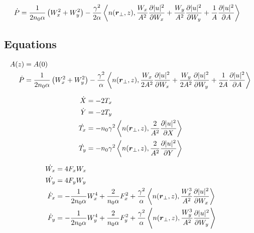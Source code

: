 \begin{equation}
\begin{split}
    \dot{P}  &= \frac{1}{2 n_0 \alpha} \left(W_{x}^2 + W_{y}^2\right)  - \frac{\gamma^2 }{ 2 \alpha }\left<n(\mbox{\boldmath{$r$}}_{\perp},z), \frac{W_{x}}{A^2} \frac{\partial |u|^2}{\partial W_{x}}+ \frac{ W_{y}}{A^2}\frac{\partial |u|^2}{\partial W_{y}}+\frac{1}{A}\frac{\partial |u|^2}{\partial A}\right> 
\end{split}
\end{equation}



\pagebreak
\subsection{Equations}
\begin{equation}
\begin{split}
  A(z) &= A(0)\\
\dot{P}  &= \frac{1}{2 n_0 \alpha} \left(W_{x}^2 + W_{y}^2\right)  - \frac{\gamma^2 }{\alpha } \left<n(\mbox{\boldmath{$r$}}_{\perp},z), \frac{W_{x}}{2A^2} \frac{\partial |u|^2}{\partial W_{x}}+ \frac{ W_{y}}{2A^2}\frac{\partial |u|^2}{\partial W_{y}}+\frac{1}{2A}\frac{\partial |u|^2}{\partial A}\right> \\
\end{split}
\end{equation}

\begin{equation}
\begin{split}
 \dot{X} &= - 2T_x \\
\dot{Y} &= - 2T_y \\
\dot{T_x} &= - n_0 \gamma^2 \left<n(\mbox{\boldmath{$r$}}_{\perp},z), \frac{2}{A^2}\frac{\partial |u|^2}{\partial X}\right> \\
\dot{T_y} &= - n_0 \gamma^2 \left<n(\mbox{\boldmath{$r$}}_{\perp},z), \frac{2}{A^2} \frac{\partial |u|^2}{\partial Y}\right> \\
\end{split}
\end{equation}


\begin{equation}
\begin{split}
\dot{W_{x}} &= 4 F_{x}W_{x} \\
\dot{W_{y}} &= 4 F_{y}W_{y} \\
\dot{F}_{x}  &=   - \frac{1}{2 n_0 \alpha} W_{x}^4+ \frac{2}{n_0 \alpha} F_{x}^2  
+ \frac{\gamma^2}{\alpha}  \left<n(\mbox{\boldmath{$r$}}_{\perp},z), \frac{W_{x}^3}{A^2} \frac{\partial |u|^2}{\partial W_{x}}\right> \\    
\dot{F}_{y}  &=   - \frac{1}{2 n_0 \alpha} W_{y}^4 + \frac{2}{n_0 \alpha} F_{y}^2  + \frac{\gamma^2}{\alpha}  \left<n(\mbox{\boldmath{$r$}}_{\perp},z), \frac{W_{y}^3}{A^2} \frac{\partial |u|^2}{\partial W_{y}}\right>\\
\end{split}
\end{equation}


